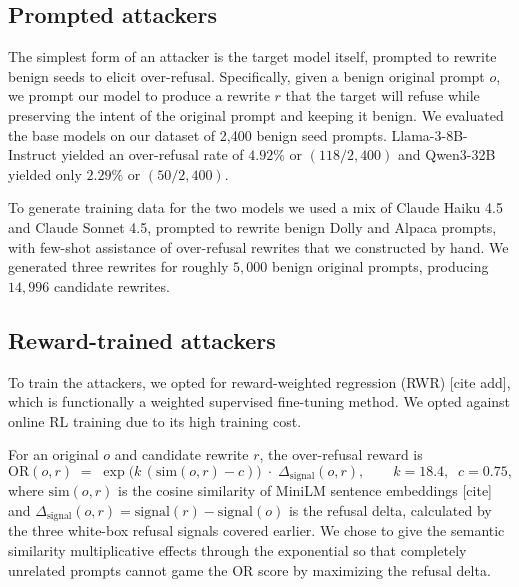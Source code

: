 \documentclass{article}
\begin{document}
\subsection{Prompted attackers}

The simplest form of an attacker is the target model itself, prompted to rewrite benign seeds to elicit over-refusal. Specifically, given a benign original prompt $o$, we prompt our model to produce a rewrite $r$ that the target will refuse while preserving the intent of the original prompt and keeping it benign. We evaluated the base models on our dataset of 2{,}400 benign seed prompts. Llama-3-8B-Instruct yielded an over-refusal rate of $4.92\%$ or $(118 / 2{,}400)$ and Qwen3-32B yielded only $2.29\%$ or $(50/2{,}400)$. 

To generate training data for the two models we used a mix of Claude Haiku 4.5 and Claude Sonnet 4.5, prompted to rewrite benign Dolly and Alpaca prompts, with few-shot assistance of over-refusal rewrites that we constructed by hand. We generated three rewrites for roughly $5{,}000$ benign original prompts, producing $14{,}996$ candidate rewrites.

\subsection{Reward-trained attackers}

To train the attackers, we opted for reward-weighted regression (RWR) [cite add], which is functionally a weighted supervised fine-tuning method. We opted against online RL training due to its high training cost.

For an original $o$ and candidate rewrite $r$, the over-refusal reward is \begin{equation}\mathrm{OR}(o,r) \;=\; \exp\!\big(k\,(\mathrm{sim}(o,r) - c)\big)\;\cdot\;\Delta_{\mathrm{signal}}(o,r),\qquad k = 18.4,\;\; c = 0.75,\label{eq:or-reward}\end{equation}where $\mathrm{sim}(o,r)$ is the cosine similarity of MiniLM sentence embeddings [cite] and $\Delta_{\mathrm{signal}}(o,r) = \mathrm{signal}(r) - \mathrm{signal}(o)$ is the refusal delta, calculated by the three white-box refusal signals covered earlier. We chose to give the semantic similarity multiplicative effects through the exponential so that completely unrelated prompts cannot game the OR score by maximizing the refusal delta.
\end{document}
